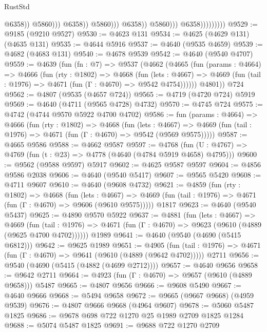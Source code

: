 \begin{lexlean}{RustStd}
\begin{coremodule}
                                                    @6358))
                                                @5860)))
                                          @6358))
                                      @5860)))
                                @6358))
                            @5860)))
                      @6358)))))))))
@9529 := @9185 (@9210 @9527)
@9530 := @4623 @131
@9534 := @4625 (@4629 @131) (@4635 @131)
@9535 := @4644 @5916
@9537 := @4640 (@9535 @4659)
@9539 := @4682 (@4683 @131)
@9540 := @4678 @9539
@9542 := @4640 (@9540 @4707)
@9559 := @4639
    (fun (fn : @7) =>
    @9537
      (@4662
        (@4665
          (fun (params : @4664) =>
          @4666
            (fun (rty : @1802) =>
            @4668
              (fun (lets : @4667) =>
              @4669 (fun (tail : @1976) => @4671 (fun (Γ : @4670) => @9542 @4754))))))
        @4801))
    @724
@9562 := @4807 (@9535 (@4657 @724))
@9565 := @4719 (@4720 @724) @5919
@9569 := @4640 (@4711 (@9565 @4728) @4732)
@9570 := @4745 @724
@9575 := @4742 (@4744 @9570 @5922 @4700 @4702)
@9586 := fun (params : @4664) =>
  @4666
    (fun (rty : @1802) =>
    @4668
      (fun (lets : @4667) =>
      @4669 (fun (tail : @1976) => @4671 (fun (Γ : @4670) => @9542 (@9569 @9575)))))
@9587 := @4665 @9586
@9588 := @4662 @9587
@9597 := @4768 (fun (U : @4767) => @4769 (fun (t : @23) => @4778 (@4640 (@4784 @5919 @4658) @4795)))
@9600 := @9562 (@9588 @9597) @5917
@9602 := @4625 @9587 @9597
@9604 := @4856 @9586 @2038
@9606 := @4640 (@9540 @5417)
@9607 := @9565 @5420
@9608 := @4711 @9607
@9610 := @4640 (@9608 @4732)
@9621 := @4859
    (fun (rty : @1802) =>
    @4668
      (fun (lets : @4667) =>
      @4669 (fun (tail : @1976) => @4671 (fun (Γ : @4670) => @9606 (@9610 @9575)))))
    @1817
@9623 := @4640 (@9540 @5437)
@9625 := @4890 @9570 @5922
@9637 := @4881
    (fun (lets : @4667) =>
    @4669
      (fun (tail : @1976) => @4671 (fun (Γ : @4670) => @9623 (@9610 (@4889 (@9625 @4700 @4702))))))
    @1989
@9641 := @4640 (@9540 (@4690 (@5415 @6812)))
@9642 := @9625 @1989
@9651 := @4905
    (fun (tail : @1976) => @4671 (fun (Γ : @4670) => @9641 (@9610 (@4889 (@9642 @4702)))))
    @2711
@9656 := @9540 (@4690 (@5415 (@4882 (@4699 @2712))))
@9657 := @4640 @9656
@9658 := @9642 @2711
@9664 := @4923 (fun (Γ : @4670) => @9657 (@9610 (@4889 @9658))) @5487
@9665 := @4807 @9656
@9666 := @9608 @5490
@9667 := @4640 @9666
@9668 := @5494 @9658
@9672 := @9665 (@9667 @9668) (@4959 @9539)
@9676 := @4807 @9666 @9668 (@4964 @9607)
@9678 := @5060 @5487 @1825
@9686 := @9678 @698 @722 @1270 @25 @1989 @2709 @1825 @1284
@9688 := @5074 @5487 @1825
@9691 := @9688 @722 @1270 @2709

\end{coremodule}
\end{lexlean}
